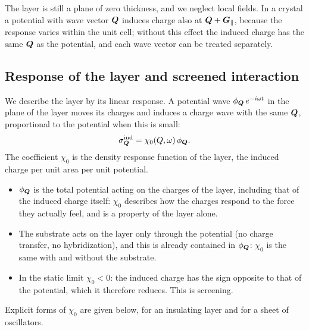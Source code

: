 \documentclass[10pt,a4paper]{paper}
\begin{document}
The layer is still a plane of zero thickness, and we neglect local fields. In a crystal a potential with wave vector
$\bm{Q}$ induces charge also at $\bm{Q} + \bm{G}_{\parallel}$, because the response varies within the unit cell; without
this effect the induced charge has the same $\bm{Q}$ as the potential, and each wave vector can be treated separately.

\subsection{Response of the layer and screened interaction}
\label{sec:screened_W}

We describe the layer by its linear response. A potential wave $\phi_{\bm{Q}}\,e^{-i\omega t}$ in the plane of the layer
moves its charges and induces a charge wave with the same $\bm{Q}$, proportional to the potential when this is small:
\begin{equation}
\sigma^{\mathrm{ind}}_{\bm{Q}} = \chi_0(Q,\omega)\,\phi_{\bm{Q}} .
\label{eq:chi0_layer}
\end{equation}
The coefficient $\chi_0$ is the density response function of the layer, the induced charge per unit area per unit
potential.
\begin{itemize}
\item $\phi_{\bm{Q}}$ is the total potential acting on the charges of the layer, including that of the induced charge
  itself: $\chi_0$ describes how the charges respond to the force they actually feel, and is a property of the layer
  alone.
\item The substrate acts on the layer only through the potential (no charge transfer, no hybridization), and this
  is already contained in $\phi_{\bm{Q}}$: $\chi_0$ is the same with and without the substrate.
\item In the static limit $\chi_0 < 0$: the induced charge has the sign opposite to that of the potential, which it
  therefore reduces. This is screening.
\end{itemize}
Explicit forms of $\chi_0$ are given below, for an insulating layer and for a sheet of oscillators.
\end{document}
